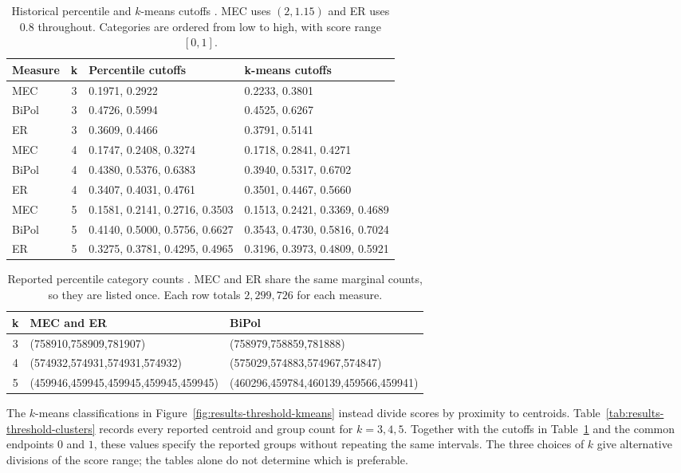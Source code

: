 \documentclass{article}
\theoremstyle{plain}
\theoremstyle{remark}
\begin{document}
\begin{table}[htbp]
\centering
\caption{Historical percentile and $k$-means cutoffs \citep{narvaez2025thresholds}. MEC uses $(2,1.15)$ and ER uses $0.8$ throughout. Categories are ordered from low to high, with score range $[0,1]$.}
\label{tab:results-thresholds}
\footnotesize
\setlength{\tabcolsep}{3pt}
\begin{tabular}{@{}lcll@{}}
\toprule
Measure & k & Percentile cutoffs & k-means cutoffs\\
\midrule
MEC & 3 & 0.1971, 0.2922 & 0.2233, 0.3801\\
BiPol & 3 & 0.4726, 0.5994 & 0.4525, 0.6267\\
ER & 3 & 0.3609, 0.4466 & 0.3791, 0.5141\\
MEC & 4 & 0.1747, 0.2408, 0.3274 & 0.1718, 0.2841, 0.4271\\
BiPol & 4 & 0.4380, 0.5376, 0.6383 & 0.3940, 0.5317, 0.6702\\
ER & 4 & 0.3407, 0.4031, 0.4761 & 0.3501, 0.4467, 0.5660\\
MEC & 5 & 0.1581, 0.2141, 0.2716, 0.3503 & 0.1513, 0.2421, 0.3369, 0.4689\\
BiPol & 5 & 0.4140, 0.5000, 0.5756, 0.6627 & 0.3543, 0.4730, 0.5816, 0.7024\\
ER & 5 & 0.3275, 0.3781, 0.4295, 0.4965 & 0.3196, 0.3973, 0.4809, 0.5921\\
\bottomrule
\end{tabular}
\end{table}

\begin{table}[htbp]
\centering
\caption{Reported percentile category counts \citep{narvaez2025thresholds}. MEC and ER share the same marginal counts, so they are listed once. Each row totals $2{,}299{,}726$ for each measure.}
\label{tab:results-threshold-percentile-counts}
\footnotesize
\setlength{\tabcolsep}{3pt}
\begin{tabular}{@{}cll@{}}
\toprule
k & MEC and ER & BiPol\\
\midrule
3 & (758910,758909,781907) & (758979,758859,781888)\\
4 & (574932,574931,574931,574932) & (575029,574883,574967,574847)\\
5 & (459946,459945,459945,459945,459945) & (460296,459784,460139,459566,459941)\\
\bottomrule
\end{tabular}
\end{table}

The $k$-means classifications in Figure~\ref{fig:results-threshold-kmeans} instead divide scores by proximity to centroids. Table~\ref{tab:results-threshold-clusters} records every reported centroid and group count for $k=3,4,5$. Together with the cutoffs in Table~\ref{tab:results-thresholds} and the common endpoints $0$ and $1$, these values specify the reported groups without repeating the same intervals. The three choices of $k$ give alternative divisions of the score range; the tables alone do not determine which is preferable.
\end{document}
